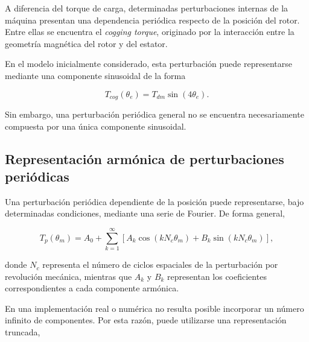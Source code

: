 A diferencia del torque de carga, determinadas perturbaciones internas de la 
máquina presentan una dependencia periódica respecto de la posición del rotor. 
Entre ellas se encuentra el \textit{cogging torque}, originado por la 
interacción entre la geometría magnética del rotor y del estator.

En el modelo inicialmente considerado, esta perturbación puede representarse 
mediante una componente sinusoidal de la forma

\begin{equation}
T_{cog}(\theta_e)
=
T_{dm}\sin(4\theta_e).
\end{equation}

Sin embargo, una perturbación periódica general no se encuentra necesariamente 
compuesta por una única componente sinusoidal.



\subsection{Representación armónica de perturbaciones periódicas}

%

Una perturbación periódica dependiente de la posición puede representarse, 
bajo determinadas condiciones, mediante una serie de Fourier. De forma 
general,

\begin{equation}
\label{eq:fourier_perturbacion}
T_p(\theta_m)
=
A_0
+
\sum_{k=1}^{\infty}
\left[
A_k\cos(kN_c\theta_m)
+
B_k\sin(kN_c\theta_m)
\right],
\end{equation}

donde $N_c$ representa el número de ciclos espaciales de la perturbación por 
revolución mecánica, mientras que $A_k$ y $B_k$ representan los coeficientes 
correspondientes a cada componente armónica.

En una implementación real o numérica no resulta posible incorporar un número 
infinito de componentes. Por esta razón, puede utilizarse una representación 
truncada,

